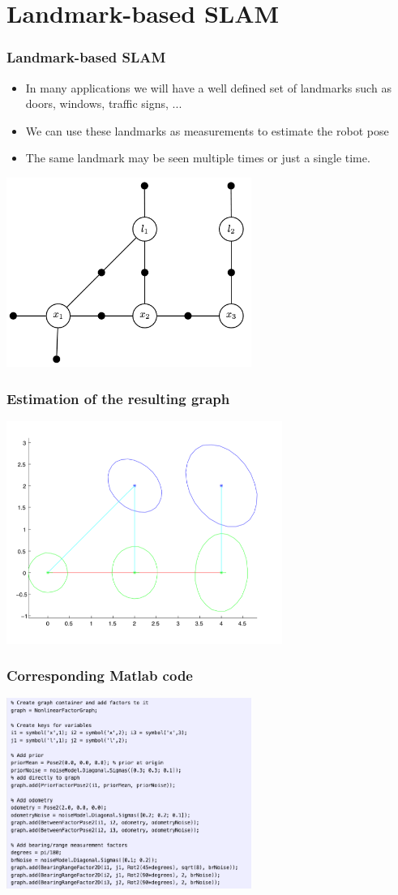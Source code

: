\documentclass[10pt]{beamer}
\begin{document}
\section{Landmark-based SLAM}
\begin{frame}
  \frametitle{Landmark-based SLAM}
  \begin{itemize}
    \item In many applications we will have a well defined set of landmarks such as doors, windows, traffic signs, ... 
    \item We can use these landmarks as measurements to estimate the robot pose
    \item The same landmark may be seen multiple times or just a single time. 
  \end{itemize}
  \centerline{\includegraphics[width=8cm]{FactorGraph4.png}}
\end{frame}

\begin{frame}
  \frametitle{Estimation of the resulting graph}
  \centerline{\includegraphics[width=9cm]{example2.png}}
\end{frame}

\begin{frame}
  \frametitle{Corresponding Matlab code}
  \centerline{\includegraphics[width=8cm]{lms-matlab.png}}
\end{frame}
\end{document}
